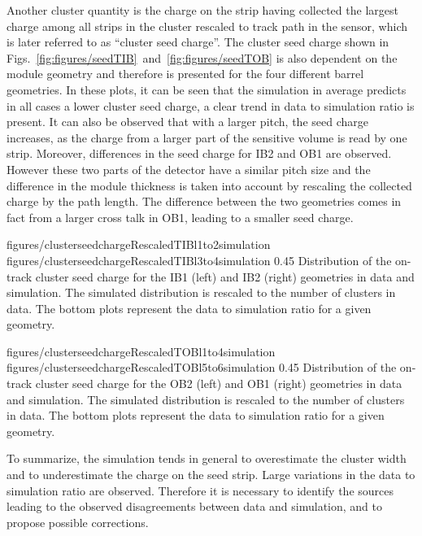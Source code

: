 Another cluster quantity is the charge on the strip having collected the largest charge among all strips in the cluster rescaled to track path in the sensor, which is later referred to as ``cluster seed charge''. The cluster seed charge shown in Figs.~\ref{fig:figures/seedTIB}~and~\ref{fig:figures/seedTOB} is also dependent on the module geometry and therefore is presented for the four different barrel geometries. In these plots, it can be seen that the simulation in average predicts in all cases a lower cluster seed charge, a clear trend in data to simulation ratio is present. It can also be observed that with a larger pitch, the seed charge increases, as the charge from a larger part of the sensitive volume is read by one strip. Moreover, differences in the seed charge for IB2 and OB1 are observed. However these two parts of the detector have a similar pitch size and the difference in the module thickness is taken into account by rescaling the collected charge by the path length. The difference between the two geometries comes in fact from a larger cross talk in OB1, leading to a smaller seed charge.


                 {figures/clusterseedchargeRescaledTIBl1to2simulation}
                 {figures/clusterseedchargeRescaledTIBl3to4simulation} %
                 {0.45}       %
                 { Distribution of the on-track cluster seed charge for the IB1 (left) and IB2 (right) geometries in data and simulation. The simulated distribution is rescaled to the number of clusters in data. The bottom plots represent the data to simulation ratio for a given geometry. }

                 {figures/clusterseedchargeRescaledTOBl1to4simulation}
                 {figures/clusterseedchargeRescaledTOBl5to6simulation} %
                 {0.45}       %
                 { Distribution of the on-track cluster seed charge for the OB2 (left) and OB1 (right) geometries in data and simulation. The simulated distribution is rescaled to the number of clusters in data. The bottom plots represent the data to simulation ratio for a given geometry. }


To summarize, the simulation tends in general to overestimate the cluster width and to underestimate the charge on the seed strip. Large variations in the data to simulation ratio are observed. Therefore it is necessary to identify the sources leading to the observed disagreements between data and simulation, and to propose possible corrections.

